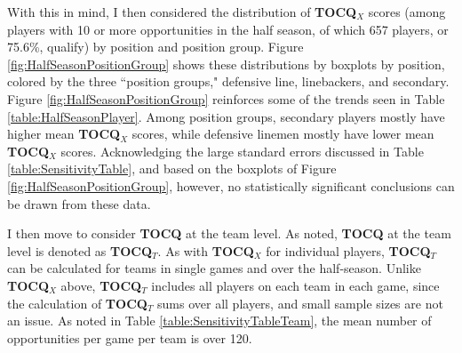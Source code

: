 \documentclass{article}
\begin{document}
With this in mind, I then considered the distribution of \textbf{TOCQ$_X$} scores (among players with 10 or more opportunities in the half season, of which 657 players, or 75.6\%, qualify) by position and position group. Figure \ref{fig:HalfSeasonPositionGroup} shows these distributions by boxplots by position, colored by the three ``position groups," defensive line, linebackers, and secondary. Figure \ref{fig:HalfSeasonPositionGroup} reinforces some of the trends seen in Table \ref{table:HalfSeasonPlayer}. Among position groups, secondary players mostly have higher mean \textbf{TOCQ$_X$} scores, while defensive linemen mostly have lower mean \textbf{TOCQ$_X$} scores. Acknowledging the large standard errors discussed in Table \ref{table:SensitivityTable}, and based on the boxplots of Figure \ref{fig:HalfSeasonPositionGroup}, however, no statistically significant conclusions can be drawn from these data.

I then move to consider \textbf{TOCQ} at the team level. As noted, \textbf{TOCQ} at the team level is denoted as \textbf{TOCQ$_T$}. As with \textbf{TOCQ$_X$} for individual players, \textbf{TOCQ$_T$} can be calculated for teams in single games and over the half-season. Unlike \textbf{TOCQ$_X$} above, \textbf{TOCQ$_T$} includes all players on each team in each game, since the calculation of \textbf{TOCQ$_T$} sums over all players, and small sample sizes are not an issue. As noted in Table \ref{table:SensitivityTableTeam}, the mean number of opportunities per game per team is over 120.
\end{document}
